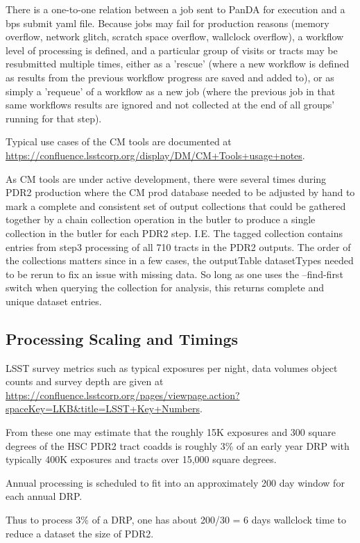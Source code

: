 There is a one-to-one relation between a job sent to PanDA for execution and a bps submit yaml file.
Because jobs may fail for production reasons (memory overflow, network glitch, scratch space overflow,
wallclock overflow), a workflow level of processing is defined, and a particular group of visits or tracts
may be resubmitted multiple times, either as a 'rescue' (where a new workflow is defined as results from
the previous workflow progress are saved and added to), or as simply a 'requeue' of a workflow as a new
job (where the previous job in that same workflows results are ignored and not collected at the end of
all groups' running for that step).

Typical use cases of the CM tools are documented at 
\url{https://confluence.lsstcorp.org/display/DM/CM+Tools+usage+notes}.

As CM tools are under active development, there were several times during PDR2 production where the CM
prod database needed to be adjusted by hand to mark a complete and consistent set of output collections
that could be gathered together by a chain collection operation in the butler to produce a single 
collection in the butler for each PDR2 step.  I.E. The tagged collection 
 contains entries from step3 processing of all 710 tracts in the PDR2 outputs. The order of the
collections matters since in a few cases, the outputTable datasetTypes needed to be rerun to fix an
issue with missing data.  So long as one uses the --find-first switch when querying the collection for
analysis, this returns complete and unique dataset entries.

\subsection{Processing Scaling and Timings}

LSST survey metrics such as typical exposures per night, data volumes
object counts and survey depth are given at 
\url{https://confluence.lsstcorp.org/pages/viewpage.action?spaceKey=LKB&title=LSST+Key+Numbers}.

From these one may estimate that the roughly 15K exposures and 300 
square degrees of the HSC PDR2 tract coadds is roughly 3\% of an 
early year DRP with typically 400K exposures and tracts 
over 15,000 square degrees.

Annual processing is scheduled to fit into an approximately 200 day window
for each annual DRP.

Thus to process 3\% of a DRP, one has about 200/30 = 6 days wallclock time
to reduce a dataset the size of PDR2.

